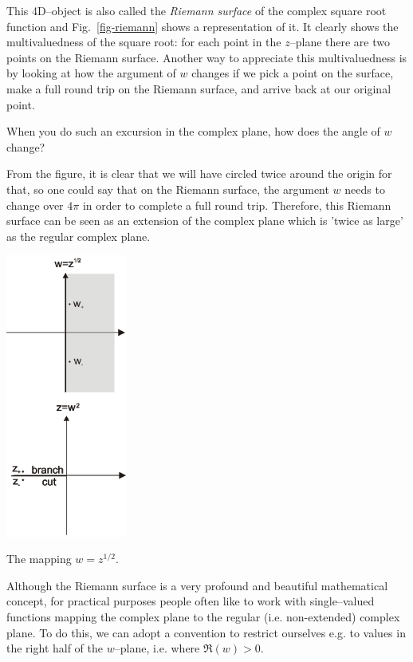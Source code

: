 This 4D--object is also called the \emph{Riemann surface} of the complex square root function and Fig.~\ref{fig-riemann} shows a representation of it. It clearly shows the multivaluedness of the square root: for each point in the $z$--plane there are two points on the Riemann surface. Another way to appreciate this multivaluedness is by looking at how the argument of $w$ changes if we pick a point on the surface, make a full round trip on the Riemann surface, and arrive back at our original point.

\begin{cue}
When you do such an excursion in the complex plane, how does the angle of $w$ change? 
\end{cue}

From the figure, it is clear that we will have circled twice around the origin for that, so one could say that on the Riemann surface, the argument $w$ needs to change over $4 \pi$ in order to complete a full round trip. Therefore, this Riemann surface can be seen as an extension of the complex plane which is 'twice as large' as the regular complex plane.

\begin{marginfigure}
\centering
\includegraphics[width=4cm]{complex/figures/branchcut_portrait}
\caption{The mapping $w=z^{1/2}$.}
\label{fig-branchcut}
\end{marginfigure}

Although the Riemann surface is a very profound and beautiful mathematical concept, for practical purposes people often like to work with single--valued functions mapping the complex plane to the regular (i.e. non-extended) complex plane. To do this, we can adopt a convention to restrict ourselves e.g. to values in the right half of the $w$--plane, i.e. where $\Re(w)>0$.

